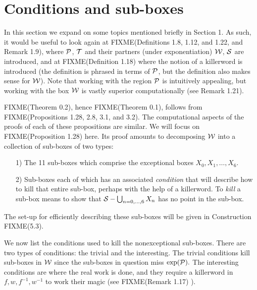  
\section{Conditions and sub-boxes}
  
In this section we expand on some topics mentioned briefly in Section 1.  As such, it would be useful to look again at
FIXME(Definitions 1.8, 1.12, and 1.22, and Remark 1.9),
where ${\cal P}$, ${\cal T}$ and their partners (under exponentiation)
${\cal W}$, ${\cal S}$ are introduced, and at
FIXME(Definition 1.18)
 where the notion of a killerword is introduced (the
definition is phrased in terms of ${\cal P}$, but the definition also makes sense for ${\cal W}$).  Note that working with
the region
${\cal P}$ is intuitively appealing, but working with the box ${\cal W}$ is vastly superior computationally (see Remark
1.21).

FIXME(Theorem 0.2),
hence
FIXME(Theorem 0.1), follows from
FIXME(Propositions 1.28, 2.8, 3.1, and 3.2).
  The computational aspects of the proofs of each of these propositions are similar.  We will focus on
FIXME(Proposition 1.28)
 here.
Its proof   amounts to decomposing 
 ${\cal W}$ into a collection of sub-boxes of two types:
\begin{itemize}
\item[1)]   The 11 sub-boxes which comprise the 
exceptional boxes $X_0, X_1, \ldots, X_6.$ 

\item[2)]   Sub-boxes each of which has an associated {\it condition} that will describe how to kill that entire sub-box,
perhaps with the help of a killerword.  To {\it kill} a sub-box means to show that 
${\cal S} - \bigcup_{n = 0,\dots, 6} X_n$ has no point in the sub-box. 
\end{itemize}
\noindent The set-up for efficiently describing these sub-boxes will be given in Construction FIXME(5.3). 
 

We now list the conditions used to kill the nonexceptional sub-boxes.  There are two types of conditions: the trivial and
the interesting.  The trivial conditions kill sub-boxes in ${\cal W}$ since the sub-boxes in question miss 
$\exp({\cal P}).$  The interesting conditions are where the real work is done, and they require a killerword in $f, w,
f^{-1}, w^{-1}$ to work their magic (see
FIXME(Remark 1.17)
).

